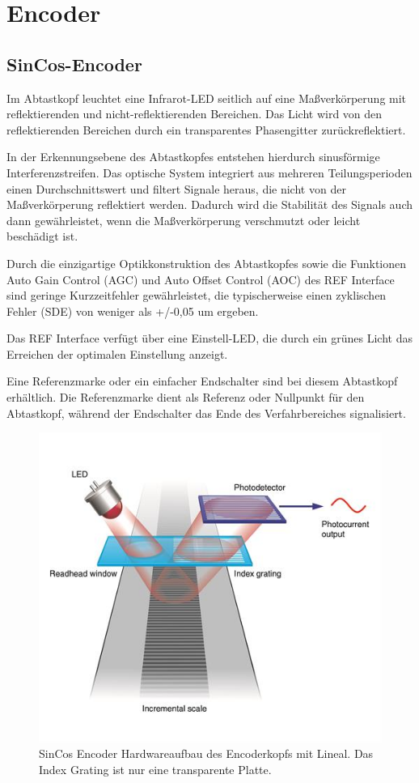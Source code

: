 \section{Encoder}
	\subsection{SinCos-Encoder}
		Im Abtastkopf leuchtet eine Infrarot-LED seitlich auf eine Maßverkörperung mit reflektierenden und nicht-reflektierenden Bereichen. Das Licht wird von den reflektierenden Bereichen durch ein transparentes Phasengitter zurückreflektiert.
		
		In der Erkennungsebene des Abtastkopfes entstehen hierdurch sinusförmige Interferenzstreifen. Das optische System integriert aus mehreren Teilungsperioden einen Durchschnittswert und filtert Signale heraus, die nicht von der Maßverkörperung reflektiert werden. Dadurch wird die Stabilität des Signals auch dann gewährleistet, wenn die Maßverkörperung verschmutzt oder leicht beschädigt ist.
		
		Durch die einzigartige Optikkonstruktion des Abtastkopfes sowie die Funktionen Auto Gain Control (AGC) und Auto Offset Control (AOC) des REF Interface sind geringe Kurzzeitfehler gewährleistet, die typischerweise einen zyklischen Fehler (SDE) von weniger als +/-0,05 um ergeben.
		
		Das REF Interface verfügt über eine Einstell-LED, die durch ein grünes Licht das Erreichen der optimalen Einstellung anzeigt.
		
		Eine Referenzmarke oder ein einfacher Endschalter sind bei diesem Abtastkopf erhältlich. Die Referenzmarke dient als Referenz oder Nullpunkt für den Abtastkopf, während der Endschalter das Ende des Verfahrbereiches signalisiert.
		\begin{figure}
			\centering
			\includegraphics[width=0.7\linewidth]{./pics/sincos_encoder}
			\caption{SinCos Encoder Hardwareaufbau des Encoderkopfs mit Lineal. Das Index Grating ist nur eine transparente Platte.}
		\end{figure}
